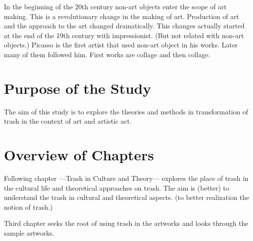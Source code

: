 
In the beginning of the 20th century non-art objects enter the scope of art making. This is a revolutionary change in the making of art. Production of art and the approach to the art changed dramatically. This changes actually started at the end of the 19th century with impressionist. (But not related with non-art objects.) Picasso is the first artist that used non-art object in his works. Later many of them followed him. First works are collage and then collage.  




\section{Purpose of the Study}

The aim of this study is to explore the theories and methods in transformation of trash in the context of art and artistic act.


\section{Overview of Chapters}
Following chapter ---Trash in Culture and Theory--- explores the place of trash in the cultural life and theoretical approaches on trash. The aim is (better) to understand the trash in cultural and theoretical aspects. (to better realization the notion of trash.)

Third chapter seeks the root of using trash in the artworks and looks through the sample artworks.

